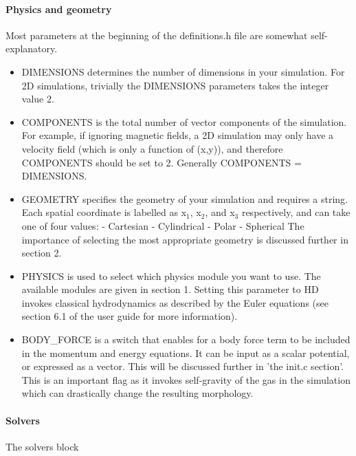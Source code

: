 \documentclass[12pt]{article}
\begin{document}
\paragraph{Physics and geometry}\mbox{}
\newline
Most parameters at the beginning of the definitions.h file are somewhat self-explanatory. 
\begin{itemize}
\item DIMENSIONS  determines the number of dimensions in your simulation. For 2D simulations, trivially the DIMENSIONS parameters takes the integer value 2. 

\item COMPONENTS is the total number of vector components of the simulation. For example, if ignoring magnetic fields, a 2D simulation may only have a velocity field (which is only a function of (x,y)), and therefore COMPONENTS should be set to 2. Generally COMPONENTS = DIMENSIONS.

\item GEOMETRY specifies the geometry of your simulation and requires a string. Each spatial coordinate is labelled as x$_1$, x$_2$, and x$_3$ respectively, and can take one of four values:
\subitem - Cartesian
\subitem - Cylindrical
\subitem - Polar
\subitem - Spherical
The importance of selecting the most appropriate geometry is discussed further in section 2.

\item PHYSICS is used to select which physics module you want to use. The available modules are given in section 1. Setting this parameter to HD invokes classical hydrodynamics as described by the Euler equations (see section 6.1 of the user guide for more information).

\item BODY\_FORCE is a switch that enables for a body force term to be included in the momentum and energy equations. It can be input as a scalar potential, or expressed as a vector. This will be discussed further in 'the init.c section'. This is an important flag as it invokes self-gravity of the gas in the simulation which can drastically change the resulting morphology.
\end{itemize}

\paragraph{Solvers}
The solvers block 
\end{document}
